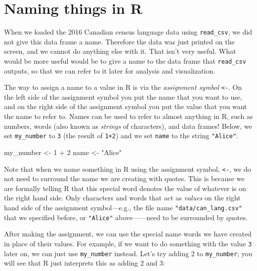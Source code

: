\documentclass[
  12pt,
]{krantz}
\newenvironment{Shaded}{\begin{snugshade}}{\end{snugshade}}
\newcommand{\DecValTok}[1]{\textcolor[rgb]{0.06,0.06,0.06}{#1}}
\newcommand{\NormalTok}[1]{#1}
\newcommand{\OtherTok}[1]{\textcolor[rgb]{0.37,0.37,0.37}{#1}}
\newcommand{\SpecialCharTok}[1]{\textcolor[rgb]{0,0,0}{#1}}
\newcommand{\StringTok}[1]{\textcolor[rgb]{0.5,0.5,0.5}{#1}}
\begin{document}
\hypertarget{naming-things-in-r}{%
\section{Naming things in R}\label{naming-things-in-r}}

When we loaded the 2016 Canadian census language data
using \texttt{read\_csv}, we did not give this data frame a name.
Therefore the data was just printed on the screen,
and we cannot do anything else with it. That isn't very useful.
What would be more useful would be to give a name
to the data frame that \texttt{read\_csv} outputs,
so that we can refer to it later for analysis and visualization.

The way to assign a name to a value in R is via the \emph{assignment symbol} \texttt{\textless{}-}.
On the left side of the assignment symbol you put the name that you want
to use, and on the right side of the assignment symbol
you put the value that you want the name to refer to.
Names can be used to refer to almost anything in R, such as numbers,
words (also known as \emph{strings} of characters), and data frames!
Below, we set \texttt{my\_number} to \texttt{3} (the result of \texttt{1+2})
and we set \texttt{name} to the string \texttt{"Alice"}. 

\begin{Shaded}
\begin{Highlighting}[]
\NormalTok{my\_number }\OtherTok{\textless{}{-}} \DecValTok{1} \SpecialCharTok{+} \DecValTok{2}
\NormalTok{name }\OtherTok{\textless{}{-}} \StringTok{"Alice"}
\end{Highlighting}
\end{Shaded}

Note that when
we name something in R using the assignment symbol, \texttt{\textless{}-},
we do not need to surround the name we are creating with quotes. This is
because we are formally telling R that this special word denotes
the value of whatever is on the right hand side.
Only characters and words that act as \emph{values} on the right hand side of the assignment
symbol---e.g., the file name \texttt{"data/can\_lang.csv"} that we specified before, or \texttt{"Alice"} above------need
to be surrounded by quotes.

After making the assignment, we can use the special name words we have created in
place of their values. For example, if we want to do something with the value \texttt{3} later on,
we can just use \texttt{my\_number} instead. Let's try adding 2 to \texttt{my\_number}; you will see that
R just interprets this as adding 2 and 3:
\end{document}
